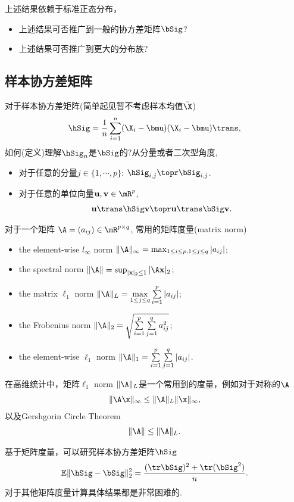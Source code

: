 	\begin{remark}上述结果依赖于标准正态分布，
		\begin{itemize}
			\item 上述结果可否推广到一般的协方差矩阵$\bSig$? 
			\item 上述结果可否推广到更大的分布族?
		\end{itemize}
	\end{remark}




\subsection{样本协方差矩阵}
对于样本协方差矩阵(简单起见暂不考虑样本均值$\bar{\X}$)
\begin{align*}
	\hSig=\frac{1}{n} \sum_{i=1}^n (\X_i-\bmu)(\X_i-\bmu)\trans,
\end{align*}
如何(定义)理解$\hSig_n$是$\bSig$的?从分量或者二次型角度,
\begin{itemize}
	\item 对于任意的分量$j \in \{1,\cdots,p\}$:  $\hSig_{i,j} \topr \bSig_{i,j}$.
	\item 对于任意的单位向量$\u,\v \in \mR^p$, 
	\begin{align*}
		\u \trans \hSig \v \topr \u \trans \bSig \v.
	\end{align*}
\end{itemize}

\begin{defin}[矩阵norm]
	对于一个矩阵 $\A=(a_{ij})\in \mR^{p\times q}$, 常用的矩阵度量(matrix norm)
	\begin{itemize}
		\item the element-wise $l_{\infty}$ norm $\|\A\|_{\infty}=\max_{1\leq i \leq p, 1 \leq j \leq q} |a_{ij}|$;
		\item the spectral norm $\|\A\|=\sup_{|\mathbf{x}|_2\leq 1}|\A \mathbf{x}|_2$;
		\item the matrix $\ell_1$ norm $\|\A\|_{L}=\max\limits_{1\leq j\leq q}\sum\limits_{i=1}^{p}|a_{ij}|$;
		\item the Frobenius norm $\|\A\|_2=\sqrt{\sum\limits_{i=1}^p\sum \limits_{j=1}^{q}a_{ij}^2}$;
		\item the element-wise $\ell_1$ norm $\|\A\|_1=\sum\limits_{i=1}^p\sum\limits_{j=1}^{q}|a_{ij}|$.
	\end{itemize}
\end{defin}

\begin{remark}
	在高维统计中，矩阵$\ell_1$ norm $\|\A\|_{L}$是一个常用到的度量，例如对于对称的$\A$
	\begin{align*}
		\|\A \x\|_\infty \leq \|\A\|_{L} \|\x\|_{\infty},
	\end{align*}
	以及Gershgorin Circle Theorem
	\begin{align*}
		\|\A\|\leq \|\A\|_{L}.
	\end{align*}
\end{remark}
基于矩阵度量，可以研究样本协方差矩阵$\hSig$
\begin{align*}
	\E \|\hSig-\bSig\|_2^2=\frac{(\tr \bSig)^2+\tr(\bSig^2)}{n}.
\end{align*}
对于其他矩阵度量计算具体结果都是非常困难的.

